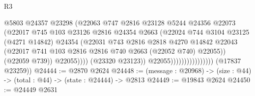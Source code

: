 \begin{lexlean}{R3}
\begin{coremodule}
                                            @5803
                                            @24357
                                            @23298
                                            (@22063
                                              @747
                                              @2816
                                              @23128
                                              @5244
                                              @24356
                                              @22073
                                              (@22017
                                                @745
                                                @103
                                                @23126
                                                @2816
                                                @24354
                                                @2663
                                                (@22024
                                                  @744
                                                  @3104
                                                  @23125
                                                  (@4271 @14842)
                                                  @24354
                                                  (@22031
                                                    @743
                                                    @2816
                                                    @2818
                                                    @4270
                                                    @14842
                                                    @22043
                                                    (@22017
                                                      @741
                                                      @103
                                                      @2816
                                                      @2816
                                                      @740
                                                      @2663
                                                      (@22052 @740)
                                                      @22055))
                                                  (@22059 @739))
                                                @22055))))
                                        (@23320 @23123))
                                      @22055))))))))))))))))
      (@17837 @23259))
@24444 := @2870 @2624
@24448 := (message : @20968) -> (size : @44) -> (total : @44) -> (state : @24444) -> @2813
@24449 := @19843 @2624
@24450 := @24449 @2631

\end{coremodule}
\end{lexlean}

